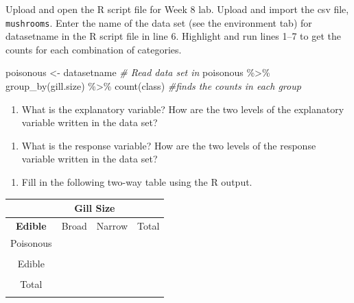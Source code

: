 \documentclass[
]{report}
\newenvironment{Shaded}{\begin{snugshade}}{\end{snugshade}}
\newcommand{\CommentTok}[1]{\textcolor[rgb]{0.56,0.35,0.01}{\textit{#1}}}
\newcommand{\FunctionTok}[1]{\textcolor[rgb]{0.00,0.00,0.00}{#1}}
\newcommand{\NormalTok}[1]{#1}
\newcommand{\OtherTok}[1]{\textcolor[rgb]{0.56,0.35,0.01}{#1}}
\newcommand{\SpecialCharTok}[1]{\textcolor[rgb]{0.00,0.00,0.00}{#1}}
\providecommand{\tightlist}{%
  \setlength{\itemsep}{0pt}\setlength{\parskip}{0pt}}
\begin{document}
Upload and open the R script file for Week 8 lab. Upload and import the csv file, \texttt{mushrooms}. Enter the name of the data set (see the environment tab) for datasetname in the R script file in line 6. Highlight and run lines 1--7 to get the counts for each combination of categories.

\begin{Shaded}
\begin{Highlighting}[]
\NormalTok{poisonous }\OtherTok{\textless{}{-}}\NormalTok{ datasetname }\CommentTok{\# Read data set in}
\NormalTok{poisonous }\SpecialCharTok{\%\textgreater{}\%} \FunctionTok{group\_by}\NormalTok{(gill.size) }\SpecialCharTok{\%\textgreater{}\%} \FunctionTok{count}\NormalTok{(class) }\CommentTok{\#finds the counts in each group}
\end{Highlighting}
\end{Shaded}

\begin{enumerate}
\def\labelenumi{\arabic{enumi}.}
\tightlist
\item
  What is the explanatory variable? How are the two levels of the explanatory variable written in the data set?
\end{enumerate}

\vspace{0.5in}

\begin{enumerate}
\def\labelenumi{\arabic{enumi}.}
\setcounter{enumi}{1}
\tightlist
\item
  What is the response variable? How are the two levels of the response variable written in the data set?
\end{enumerate}

\vspace{0.5in}

\newpage

\begin{enumerate}
\def\labelenumi{\arabic{enumi}.}
\setcounter{enumi}{2}
\tightlist
\item
  Fill in the following two-way table using the R output.
\end{enumerate}

\begin{center}
\begin{tabular}{|c|c|c|c|}\hline
& \multicolumn{2}{|c|}{\textbf{Gill Size}} & \\ \hline
\textbf{Edible} & Broad & Narrow & Total \\ \hline
 Poisonous & & & \\ 
 & & & \\ \hline
Edible & & & \\ 
 & & & \\ \hline
 Total & & & \\ 
 & & & \\ \hline
\end{tabular}
\end{center}
\end{document}
